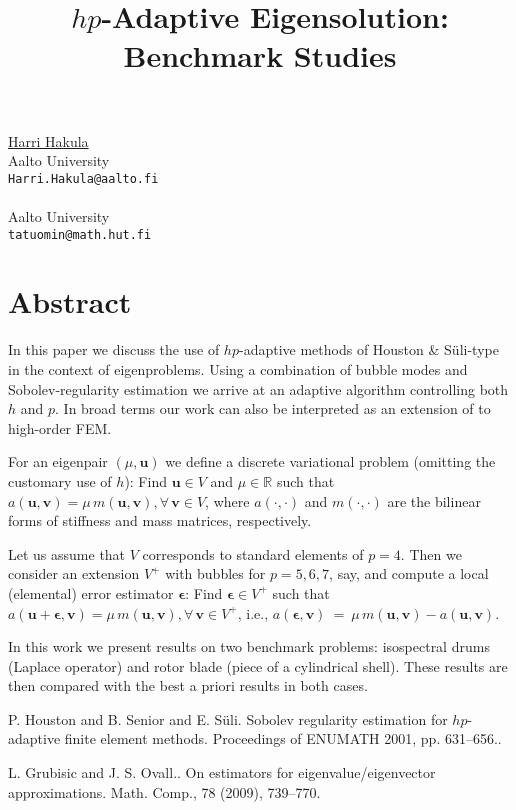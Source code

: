 \title{$hp$-Adaptive Eigensolution: Benchmark Studies}
 \author{} \institute{}
\maketitle
\begin{center}
{\large \underline{Harri Hakula}}\\
Aalto University\\
{\tt Harri.Hakula@aalto.fi}
\\ \vspace{4mm}{\large Tomi Tuominen}\\
Aalto University\\
{\tt tatuomin@math.hut.fi}

\end{center}

\section*{Abstract}

In this paper we discuss the use of $hp$-adaptive methods of Houston \& S\"uli-type 
\cite{HSS} in the context of eigenproblems. 
Using a combination of bubble modes and Sobolev-regularity estimation
we arrive at an adaptive algorithm controlling both $h$ and $p$. 
In broad terms our work can also be interpreted as an extension of \cite{GO} to 
high-order FEM.

For an eigenpair $(\mu,\textbf{u})$ we define a discrete variational problem
(omitting the customary use of $h$): Find $\textbf{u} \in V$ and $\mu \in \mathbb{R}$ such that
$a(\textbf{u},\textbf{v}) = \mu\,m(\textbf{u},\textbf{v}), \forall\, \textbf{v} \in V$, where
$a(\cdot,\cdot)$ and $m(\cdot,\cdot)$ are the bilinear forms of stiffness and mass matrices, respectively.

Let us assume that $V$ corresponds to standard elements of $p=4$.
Then we consider an extension $V^+$ with bubbles for $p=5,6,7$, say, and compute a local (elemental)
error estimator $\boldsymbol{\epsilon}$: 
Find $\boldsymbol{\epsilon} \in V^+$ such that
$a(\textbf{u}+\boldsymbol{\epsilon},\textbf{v}) = \mu\,m(\textbf{u},\textbf{v}), \forall\, \textbf{v} \in V^+$,
i.e., $a(\boldsymbol{\epsilon},\textbf{v})~=~\mu\,m(\textbf{u},\textbf{v}) - a(\textbf{u},\textbf{v})$.

In this work we present results on two benchmark problems: isospectral drums (Laplace operator) and
rotor blade (piece of a cylindrical shell). These results are then compared with the best
a priori results in both cases.



\begin{thebibliography}{10}

{\sc P. {Houston} and B. {Senior} and E. {S\"uli}}. {Sobolev regularity estimation for $hp$-adaptive finite element methods}. Proceedings of ENUMATH 2001, pp. 631--656..



{\sc L. Grubisic and J. S. Ovall.}. {On estimators for eigenvalue/eigenvector approximations}. {Math. Comp.}, 78 (2009), 739--770.

\end{thebibliography}
